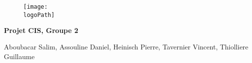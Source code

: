 \documentclass[12pt,a4paper]{report}
\newcommand{\grayIntensity}{25}
\newcommand{\logoPath}{./images/logoEnsimag.png}
\newcommand{\scaleLogo}{0.5}
\begin{document}
\begin{titlepage}
	\centering
	\begin{figure}[htp]
		\texttt{[image: \\logoPath]}
	\end{figure}

	\vspace{7.5cm}

	{\huge\bfseries\colorbox{gray!\grayIntensity}{Projet CIS, Groupe 2}\par}

	\vspace{7pt}

	Aboubacar Salim, Assouline Daniel, Heinisch Pierre, Tavernier Vincent, Thiolliere Guillaume
\end{titlepage}

\tableofcontents












\end{document}
